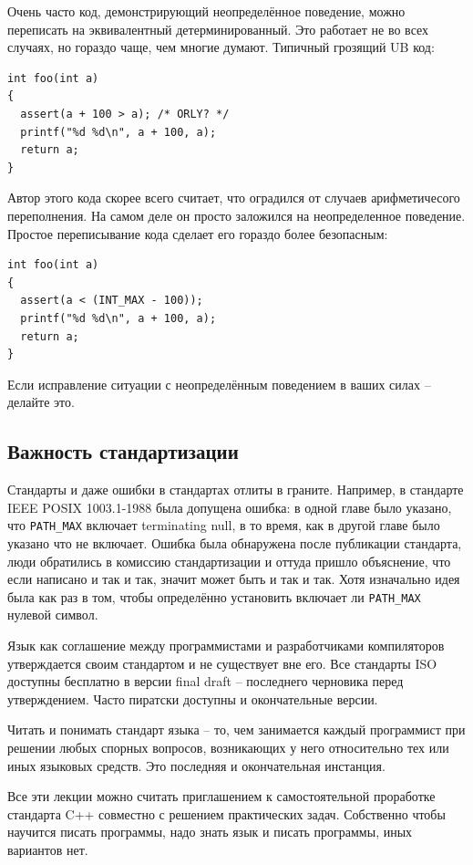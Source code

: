 \documentclass[a4paper,12pt,oneside]{article}
\begin{document}
Очень часто код, демонстрирующий неопределённое поведение, можно переписать на эквивалентный детерминированный. Это работает не во всех случаях, но гораздо чаще, чем многие думают. Типичный грозящий UB код:

\begin{lstlisting}
int foo(int a) 
{
  assert(a + 100 > a); /* ORLY? */
  printf("%d %d\n", a + 100, a);
  return a;
}
\end{lstlisting}

Автор этого кода скорее всего считает, что оградился от случаев арифметичесого переполнения. На самом деле он просто заложился на неопределенное поведение. Простое переписывание кода сделает его гораздо более безопасным:

\begin{lstlisting}
int foo(int a) 
{
  assert(a < (INT_MAX - 100));
  printf("%d %d\n", a + 100, a);
  return a;
}
\end{lstlisting}

Если исправление ситуации с неопределённым поведением в ваших силах -- делайте это.

\subsection{Важность стандартизации}\label{StandartizationImportance}

Стандарты и даже ошибки в стандартах отлиты в граните. Например, в стандарте IEEE POSIX 1003.1-1988 была допущена ошибка: в одной главе было указано, что \lstinline!PATH_MAX! включает terminating null, в то время, как в другой главе было указано что не включает. Ошибка была обнаружена после публикации стандарта, люди обратились в комиссию стандартизации и оттуда пришло объяснение, что если написано и так и так, значит может быть и так и так. Хотя изначально идея была как раз в том, чтобы определённо установить включает ли \lstinline!PATH_MAX! нулевой символ.

Язык как соглашение между программистами и разработчиками компиляторов утверждается своим стандартом и не существует вне его. Все стандарты ISO доступны бесплатно в версии final draft – последнего черновика перед утверждением. Часто пиратски доступны и окончательные версии.

Читать и понимать стандарт языка – то, чем занимается каждый программист при решении любых спорных вопросов, возникающих у него относительно тех или иных языковых средств. Это последняя и окончательная инстанция.

Все эти лекции можно считать приглашением к самостоятельной проработке стандарта C++ совместно с решением практических задач. Собственно чтобы научится писать программы, надо знать язык и писать программы, иных вариантов нет.
\end{document}
